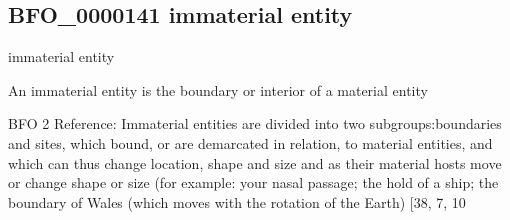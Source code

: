 \documentclass[letterpaper,10pt,english]{sphinxmanual}
\begin{document}
\subsection{BFO\_0000141 \sphinxhyphen{} immaterial entity}
\label{\detokenize{doc-BFO_0000141:bfo-0000141-immaterial-entity}}\label{\detokenize{doc-BFO_0000141:index-0}}\label{\detokenize{doc-BFO_0000141::doc}}
\begin{sphinxShadowBox}

\sphinxAtStartPar
immaterial entity
\end{sphinxShadowBox}

\begin{sphinxShadowBox}

\sphinxAtStartPar
{\hyperref[\detokenize{doc-BFO_0000004::doc}]{}}
\end{sphinxShadowBox}

\begin{sphinxShadowBox}

\sphinxAtStartPar
An immaterial entity is the boundary or interior of a material entity
\end{sphinxShadowBox}

\begin{sphinxShadowBox}

\sphinxAtStartPar
BFO 2 Reference: Immaterial entities are divided into two subgroups:boundaries and sites, which bound, or are demarcated in relation, to material entities, and which can thus change location, shape and size and as their material hosts move or change shape or size (for example: your nasal passage; the hold of a ship; the boundary of Wales (which moves with the rotation of the Earth) {[}38, 7, 10
\end{sphinxShadowBox}

\begin{sphinxShadowBox}

\sphinxAtStartPar
{}
\end{sphinxShadowBox}
\begin{quote}

\ignorespaces \end{quote}
\end{document}
